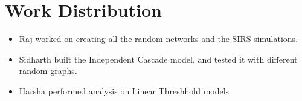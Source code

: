 \documentclass[11pt]{article}
\providecommand{\tightlist}{%
      \setlength{\itemsep}{0pt}\setlength{\parskip}{0pt}}
\begin{document}
    \hypertarget{work-distribution}{%
\section{Work Distribution}\label{work-distribution}}

\begin{itemize}
\tightlist
\item
  Raj worked on creating all the random networks and the SIRS
  simulations.
\item
  Sidharth built the Independent Cascade model, and tested it with
  different random graphs.
\item
  Harsha performed analysis on Linear Threshhold models
\end{itemize}


    
    
    
\end{document}
